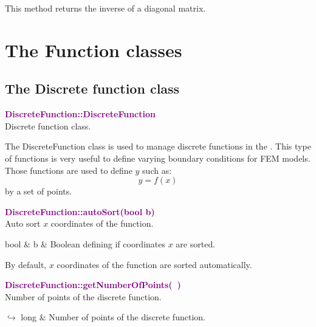 This method returns the inverse of a diagonal matrix.

\section{The Function classes}

\subsection{The Discrete function class}

\textcolor{purple}{\textbf{DiscreteFunction::DiscreteFunction}}\label{DiscreteFunction::DiscreteFunction}\\
Discrete function class.

The DiscreteFunction class is used to manage discrete functions in the \DynELA.
This type of functions is very useful to define varying boundary conditions for FEM models.
Those functions are used to define $y$ such as:
\begin{equation*}
y=f(x)
\end{equation*}
by a set of points.

\textcolor{purple}{\textbf{DiscreteFunction::autoSort(bool b)}}\label{DiscreteFunction::autoSort(bool b)}\\
Auto sort $x$ coordinates of the function.

\begin{tcolorbox}[width=\textwidth,myArgs,tabularx={ll|R}]
bool & b & Boolean defining if coordinates $x$ are sorted.
\end{tcolorbox}

By default, $x$ coordinates of the function are sorted automatically.

\textcolor{purple}{\textbf{DiscreteFunction::getNumberOfPoints(~)}}\label{DiscreteFunction::getNumberOfPoints()}\\
Number of points of the discrete function.\vspace*{-0.5em}
\begin{tcolorbox}[grow to left by=-1cm, width=\textwidth-1cm,myArgs,tabularx={l|R}]
$\hookrightarrow$ long & Number of points of the discrete function.
\end{tcolorbox}

